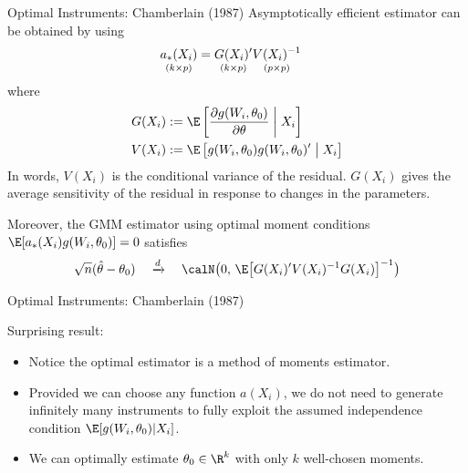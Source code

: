 \documentclass[aspectratio=169, handout]{beamer}
\newcommand{\dto}{\xrightarrow{d}}
\begin{document}
{\footnotesize
\begin{frame}{Optimal Instruments: Chamberlain (1987)}
Asymptotically efficient estimator can be obtained by using
\begin{align*}
  \underset{(k \times p)}{%
    a_*(X_i)
  }
  &=
  \underset{(k \times p)}{%
  G(X_i)'
  }
  \underset{(p \times p)}{%
  V(X_i)^{-1}
  }
\end{align*}
where
\begin{align*}
  G(X_i)
  &:=
  \E\left[
    \frac{\partial g(W_i,\theta_0)}{\partial \theta}
    \;\bigg|\;
    X_i
  \right]
  \\
  V(X_i)
  &:=
  \E\left[
    g(W_i,\theta_0)
    g(W_i,\theta_0)'
    \;\big|\;
    X_i
  \right]
\end{align*}
In words, $V(X_i)$ is the conditional variance of the residual.
$G(X_i)$ gives the average sensitivity of the residual in response to
changes in the parameters.

Moreover, the GMM estimator using optimal moment conditions
$\E[a_*(X_i)g(W_i,\theta_0)]=0$
satisfies
\begin{align*}
  \sqrt{n}(\hat{\theta}-\theta_0)
  \quad\dto\quad
  \calN\big(
  0,\,
  \E\big[G(X_i)'V(X_i)^{-1}G(X_i)\big]^{-1}
  \big)
\end{align*}

\end{frame}
}


{\footnotesize
\begin{frame}{Optimal Instruments: Chamberlain (1987)}

Surprising result:
\begin{itemize}
  \item Notice the optimal estimator is a \alert{method of moments}
    estimator.
  \item Provided we can choose any function $a(X_i)$, we \alert{do not}
    need to generate infinitely many instruments to fully exploit the
    assumed independence condition $\E[g(W_i,\theta_0)|X_i]$.

  \item We can optimally estimate $\theta_0\in \R^k$ with only $k$
    well-chosen moments.
\end{itemize}
\end{frame}
}
\end{document}
